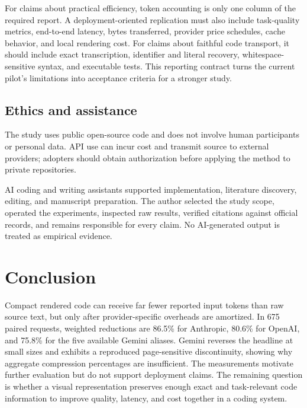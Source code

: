 \documentclass[sigconf,nonacm]{acmart}
\begin{document}
For claims about practical efficiency, token accounting is only one column of
the required report. A deployment-oriented replication must also include
task-quality metrics, end-to-end latency, bytes transferred, provider price
schedules, cache behavior, and local rendering cost. For claims about faithful
code transport, it should include exact transcription, identifier and literal
recovery, whitespace-sensitive syntax, and executable tests. This reporting
contract turns the current pilot's limitations into acceptance criteria for a
stronger study.

\subsection{Ethics and assistance}

The study uses public open-source code and does not involve human participants
or personal data. API use can incur cost and transmit source to external
providers; adopters should obtain authorization before applying the method to
private repositories.

AI coding and writing assistants supported implementation, literature
discovery, editing, and manuscript preparation. The author selected the study
scope, operated the experiments, inspected raw results, verified citations
against official records, and remains responsible for every claim. No
AI-generated output is treated as empirical evidence.

\section{Conclusion}

Compact rendered code can receive far fewer reported input tokens than raw
source text, but only after provider-specific overheads are amortized. In 675
paired requests, weighted reductions are 86.5\% for Anthropic, 80.6\% for
OpenAI, and 75.8\% for the five available Gemini aliases. Gemini reverses the
headline at small sizes and exhibits a reproduced page-sensitive
discontinuity, showing why aggregate compression percentages are insufficient.
The measurements motivate further evaluation but do not support deployment
claims. The remaining question is whether a visual representation preserves
enough exact and task-relevant code information to improve quality, latency,
and cost together in a coding system.

\balance


\end{document}
